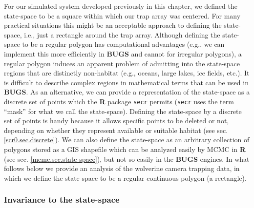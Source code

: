 For our simulated system developed previously in this chapter, we
defined the state-space to be a square within which our trap array was
centered. For many practical situations this might be an acceptable
approach to defining the state-space, i.e., just a rectangle around
the trap array.
Although defining the state-space to be a regular polygon has
computational advantages (e.g., we can implement this more efficiently
in {\bf BUGS} and cannot for irregular polygons), a regular polygon
induces an apparent problem of admitting into the state-space regions
that are distinctly non-habitat (e.g., oceans, large lakes, ice
fields, etc.).  It is difficult to describe complex regions in
mathematical terms that can be used in {\bf BUGS}. As an alternative,
we can provide a representation of the state-space as a discrete set
of points which the {\bf R} package \mbox{\tt secr}
\citep{efford:2011} permits (\mbox{\tt secr} uses the term ``mask''
for what we call the state-space).  Defining the state-space by a
discrete set of points is handy because it allows specific points to
be deleted or not, depending on whether they represent available or
suitable habitat (see sec.  \ref{scr0.sec.discrete}).  We can also
define the state-space as an arbitrary collection of polygons stored
as a GIS shapefile which can be analyzed easily by MCMC in {\bf R}
(see sec. \ref{mcmc.sec.state-space}), but not so easily in the {\bf
  BUGS} engines.  In what follows below we provide an analysis of the
wolverine camera trapping data, in which we define the state-space to
be a regular continuous polygon (a rectangle).


\subsubsection{Invariance to the state-space}
\label{scr0.sec.invariance}

